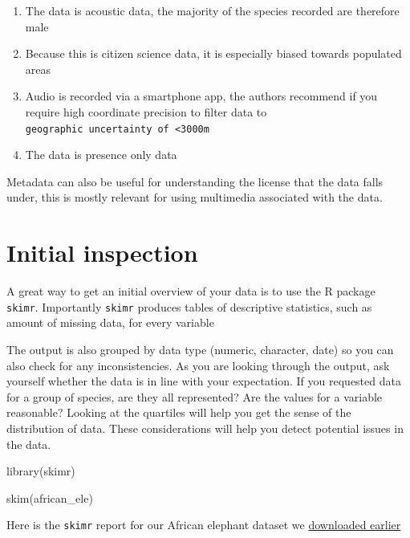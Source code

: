 \documentclass[
  letterpaper,
  DIV=11,
  numbers=noendperiod,
  oneside]{scrreprt}
\newenvironment{Shaded}{\begin{snugshade}}{\end{snugshade}}
\newcommand{\FunctionTok}[1]{\textcolor[rgb]{0.28,0.35,0.67}{#1}}
\newcommand{\NormalTok}[1]{\textcolor[rgb]{0.00,0.23,0.31}{#1}}
\providecommand{\tightlist}{%
  \setlength{\itemsep}{0pt}\setlength{\parskip}{0pt}}\usepackage{longtable,booktabs,array}
\begin{document}
\begin{enumerate}
\def\labelenumi{\arabic{enumi}.}
\tightlist
\item
  The data is acoustic data, the majority of the species recorded are
  therefore male
\item
  Because this is citizen science data, it is especially biased towards
  populated areas
\item
  Audio is recorded via a smartphone app, the authors recommend if you
  require high coordinate precision to filter data to
  \texttt{geographic\ uncertainty\ of\ \textless{}3000m}
\item
  The data is presence only data
\end{enumerate}

Metadata can also be useful for understanding the license that the data
falls under, this is mostly relevant for using multimedia associated
with the data.

\hypertarget{initial-inspection}{%
\section{Initial inspection}\label{initial-inspection}}

A great way to get an initial overview of your data is to use the R
package \texttt{skimr}. Importantly \texttt{skimr} produces tables of
descriptive statistics, such as amount of missing data, for every
variable

The output is also grouped by data type (numeric, character, date) so
you can also check for any inconsistencies. As you are looking through
the output, ask yourself whether the data is in line with your
expectation. If you requested data for a group of species, are they all
represented? Are the values for a variable reasonable? Looking at the
quartiles will help you get the sense of the distribution of data. These
considerations will help you detect potential issues in the data.

\begin{Shaded}
\begin{Highlighting}[]
\FunctionTok{library}\NormalTok{(skimr)}

\FunctionTok{skim}\NormalTok{(african\_ele)}
\end{Highlighting}
\end{Shaded}

Here is the \texttt{skimr} report for our African elephant dataset we
\protect\hyperlink{sec-download-data}{downloaded earlier}
\end{document}
